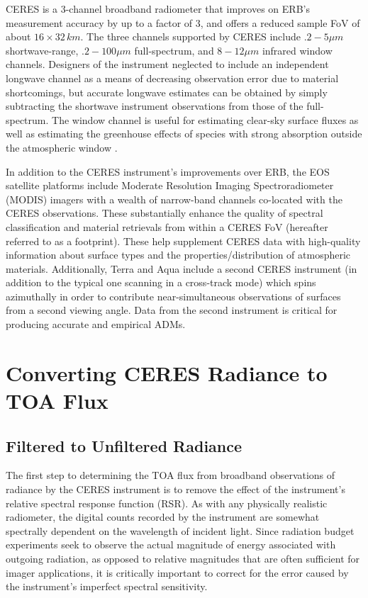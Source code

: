 \documentclass[12pt]{article}
\begin{document}
    CERES is a 3-channel broadband radiometer that improves on ERB's measurement accuracy by up to a factor of 3, and offers a reduced sample FoV of about $16\times32\,\si{km}$. The three channels supported by CERES include $.2-5\mu m$ shortwave-range, $.2-100\mu m$ full-spectrum, and $8-12\mu m$ infrared window channels. Designers of the instrument neglected to include an independent longwave channel as a means of decreasing observation error due to material shortcomings, but accurate longwave estimates can be obtained by simply subtracting the shortwave instrument observations from those of the full-spectrum. The window channel is useful for estimating clear-sky surface fluxes as well as estimating the greenhouse effects of species with strong absorption outside the atmospheric window \cite{wielicki_clouds_1996}.

    In addition to the CERES instrument's improvements over ERB, the EOS satellite platforms include Moderate Resolution Imaging Spectroradiometer (MODIS) imagers with a wealth of narrow-band channels co-located with the CERES observations. These substantially enhance the quality of spectral classification and material retrievals from within a CERES FoV (hereafter referred to as a footprint). These help supplement CERES data with high-quality information about surface types and the properties/distribution of atmospheric materials. Additionally, Terra and Aqua include a second CERES instrument (in addition to the typical one scanning in a cross-track mode) which spins azimuthally in order to contribute near-simultaneous observations of surfaces from a second viewing angle. Data from the second instrument is critical for producing accurate and empirical ADMs.

    \section{Converting CERES Radiance to TOA Flux}

    \subsection{Filtered to Unfiltered Radiance}

    The first step to determining the TOA flux from broadband observations of radiance by the CERES instrument is to remove the effect of the instrument's relative spectral response function (RSR). As with any physically realistic radiometer, the digital counts recorded by the instrument are somewhat spectrally dependent on the wavelength of incident light. Since radiation budget experiments seek to observe the actual magnitude of energy associated with outgoing radiation, as opposed to relative magnitudes that are often sufficient for imager applications, it is critically important to correct for the error caused by the instrument's imperfect spectral sensitivity.
\end{document}

